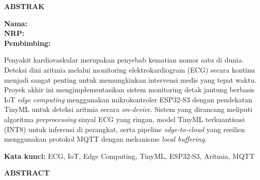 \clearpage
\thispagestyle{plain}
{}

\begin{center}
{\fontsize{12}{14}\selectfont\bfseries ABSTRAK}
\end{center}

\vspace{0.3cm}

\noindent
\textbf{\MakeUppercase{\JudulPA}}

\vspace{0.3cm}

\noindent
\textbf{Nama\hspace{1.45cm}: \NamaMahasiswa}\\
\textbf{NRP\hspace{1.65cm}: \NRP}\\
\textbf{Pembimbing\hspace{0.2cm}: \PembimbingSatu}\\
\textbf{\hspace{2.65cm} \PembimbingDua}

\vspace{0.3cm}

Penyakit kardiovaskular merupakan penyebab kematian nomor satu di dunia. Deteksi dini aritmia melalui monitoring elektrokardiogram (ECG) secara kontinu menjadi sangat penting untuk memungkinkan intervensi medis yang tepat waktu. Proyek akhir ini mengimplementasikan sistem monitoring detak jantung berbasis IoT \textit{edge computing} menggunakan mikrokontroler ESP32-S3 dengan pendekatan TinyML untuk deteksi aritmia secara \textit{on-device}. Sistem yang dirancang meliputi algoritma \textit{preprocessing} sinyal ECG yang ringan, model TinyML terkuantisasi (INT8) untuk inferensi di perangkat, serta pipeline \textit{edge-to-cloud} yang resilien menggunakan protokol MQTT dengan mekanisme \textit{local buffering}.

\vspace{0.5cm}
\noindent
\textbf{Kata kunci:} ECG, IoT, Edge Computing, TinyML, ESP32-S3, Aritmia, MQTT


\clearpage
\thispagestyle{plain}
{}

\begin{center}
{\fontsize{12}{14}\selectfont\bfseries ABSTRACT}
\end{center}

